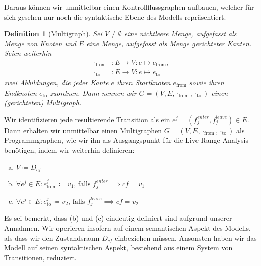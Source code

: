 \documentclass[a4paper]{article}
\newtheorem{definition}[satz]{Definition} %
\theoremstyle{nonumberplain}
\begin{document}
Daraus können wir unmittelbar einen Kontrollflussgraphen aufbauen, welcher für sich gesehen nur noch die syntaktische Ebene des Modells repräsentiert.

\newcommand{\mgtup}{$G = (V,E,\cdot_{\mathrm{from}}, \cdot_{\mathrm{to}})$}
\newcommand{\subfrom}{_{\mathrm{from}}}
\newcommand{\subto}{_{\mathrm{to}}}
\begin{definition}[Multigraph]
	Sei $V \neq \emptyset$ eine nichtleere Menge, aufgefasst als Menge von Knoten und $E$ eine Menge, aufgefasst als Menge gerichteter Kanten.
	Seien weiterhin
	\begin{align*}
	\cdot_{\mathrm{from}} &: E \to V : e \mapsto e_{\mathrm{from}}\text{,} \\
	\cdot_{\mathrm{to}} &: E \to V : e \mapsto e_{\mathrm{to}}
	\end{align*}
	zwei Abbildungen, die jeder Kante $e$ ihren Startknoten $e_{\mathrm{from}}$ sowie ihren Endknoten $e_{\mathrm{to}}$ zuordnen.
	Dann nennen wir $G = (V,E,\cdot_{\mathrm{from}}, \cdot_{\mathrm{to}})$ einen (gerichteten) Multigraph.
	
\end{definition}

Wir identifizieren jede resultierende Transition als ein $e^j = (f_j^{enter}, f_j^{leave}) \in E$.
Dann erhalten wir unmittelbar einen Multigraphen $G = (V,E,\cdot_{\mathrm{from}}, \cdot_{\mathrm{to}})$ als Programmgraphen, wie wir ihn als Ausgangspunkt für die Live Range Analysis benötigen, indem wir weiterhin definieren: 

\begin{enumerate}[(a)]
	\item $V\coloneqq D_{cf}$
	\item $\forall e^j \in E : e^j_{\mathrm{from}} \coloneqq v_1\text{, falls } f_j^{enter} \implies cf = v_1$
	\item $\forall e^j \in E : e^j_{\mathrm{to}} \coloneqq v_2\text{, falls } f_j^{leave} \implies cf = v_2$
\end{enumerate}

Es sei bemerkt, dass (b) und (c) eindeutig definiert sind aufgrund unserer Annahmen. Wir operieren insofern auf einem semantischen Aspekt des Modells, als dass wir den Zustandsraum $D_{cf}$ einbeziehen müssen. Ansonsten haben wir das Modell auf seinen syntaktischen Aspekt, bestehend aus einem System von Transitionen, reduziert.
\end{document}
